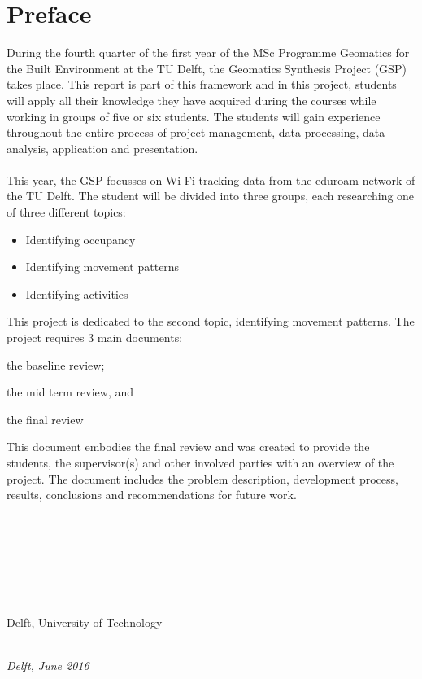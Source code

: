 \chapter*{Preface}
During the fourth quarter of the first year of the MSc Programme Geomatics for the Built Environment at the TU Delft, the Geomatics Synthesis Project (GSP) takes place. This report is part of this framework and in this project, students will apply all their knowledge they have acquired during the courses while working in groups of five or six students. The students will gain experience throughout the entire process of project management, data processing, data analysis, application and presentation. \\\\
This year, the GSP focusses on Wi-Fi tracking data from the eduroam network of the TU Delft. The student will be divided into three groups, each researching one of three different topics:
\begin{itemize}
\item Identifying occupancy
\item Identifying movement patterns
\item Identifying activities
\end{itemize}
This project is dedicated to the second topic, identifying movement patterns. The project requires 3 main documents: \begin {enumerate*} [label=\itshape\arabic*\upshape),font={\color{red!0!black}\bfseries}] \item the baseline review; \item the mid term review, and \item the final review
\end{enumerate*}
This document embodies the final review and was created to provide the students, the supervisor(s) and other involved parties with an overview of the project. The document includes the problem description, development process, results, conclusions and recommendations for future work.
\\\\
\\\\
\\\\
\\\\
Delft, University of Technology\\

\begin{flushleft}
{\makeatletter\itshape
    \@author\\
    Delft, June 2016
\makeatother}
\end{flushleft}

